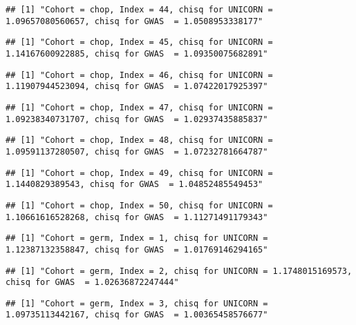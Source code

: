 \documentclass[]{article}
\begin{document}
\begin{verbatim}
## [1] "Cohort = chop, Index = 44, chisq for UNICORN = 1.09657080560657, chisq for GWAS  = 1.0508953338177"
\end{verbatim}

\begin{verbatim}
## [1] "Cohort = chop, Index = 45, chisq for UNICORN = 1.14167600922885, chisq for GWAS  = 1.09350075682891"
\end{verbatim}

\begin{verbatim}
## [1] "Cohort = chop, Index = 46, chisq for UNICORN = 1.11907944523094, chisq for GWAS  = 1.07422017925397"
\end{verbatim}

\begin{verbatim}
## [1] "Cohort = chop, Index = 47, chisq for UNICORN = 1.09238340731707, chisq for GWAS  = 1.02937435885837"
\end{verbatim}

\begin{verbatim}
## [1] "Cohort = chop, Index = 48, chisq for UNICORN = 1.09591137280507, chisq for GWAS  = 1.07232781664787"
\end{verbatim}

\begin{verbatim}
## [1] "Cohort = chop, Index = 49, chisq for UNICORN = 1.1440829389543, chisq for GWAS  = 1.04852485549453"
\end{verbatim}

\begin{verbatim}
## [1] "Cohort = chop, Index = 50, chisq for UNICORN = 1.10661616528268, chisq for GWAS  = 1.11271491179343"
\end{verbatim}

\begin{verbatim}
## [1] "Cohort = germ, Index = 1, chisq for UNICORN = 1.12387132358847, chisq for GWAS  = 1.01769146294165"
\end{verbatim}

\begin{verbatim}
## [1] "Cohort = germ, Index = 2, chisq for UNICORN = 1.1748015169573, chisq for GWAS  = 1.02636872247444"
\end{verbatim}

\begin{verbatim}
## [1] "Cohort = germ, Index = 3, chisq for UNICORN = 1.09735113442167, chisq for GWAS  = 1.00365458576677"
\end{verbatim}
\end{document}
